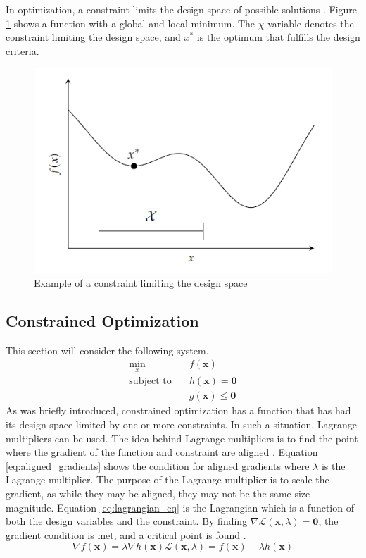 In optimization, a constraint limits the design space of possible solutions \cite{Kochenderfer_Wheeler_2019}. Figure \ref{fig:constraint_example} shows a function with a global and local minimum. The $\chi$ variable denotes the constraint limiting the design space, and $x^*$ is the optimum that fulfills the design criteria.
\begin{figure}[ht]
	\centering
	\includegraphics[width=0.6\linewidth]{figures/chapter_2/ContraintExample.png}
	\caption{Example of a constraint limiting the design space \cite{Kochenderfer_Wheeler_2019}}
	\label{fig:constraint_example}
\end{figure}

\subsection*{Constrained Optimization}
This section will consider the following system.
\begin{equation}
	\begin{split}
		\min_x \quad &f(\mathbf x) \\
		\text{subject to} \quad & h(\mathbf x) = \mathbf 0\\
		& g(\mathbf x) \leq \mathbf 0
	\end{split}
\end{equation}
As was briefly introduced, constrained optimization has a function that has had its design space limited by one or more constraints. In such a situation, Lagrange multipliers can be used. The idea behind Lagrange multipliers is to find the point where the gradient of the function and constraint are aligned \cite{Kochenderfer_Wheeler_2019}. Equation \ref{eq:aligned_gradients} shows the condition for aligned gradients where $\lambda$ is the Lagrange multiplier. The purpose of the Lagrange multiplier is to scale the gradient, as while they may be aligned, they may not be the same size magnitude. Equation \ref{eq:lagrangian_eq} is the Lagrangian which is a function of both the design variables and the constraint. By finding $\nabla\mathcal{L}(\mathbf{x},\lambda) = \mathbf{0}$, the gradient condition is met, and a critical point is found \cite{Kochenderfer_Wheeler_2019}. 
\begin{subequations}
	\begin{equation}
		\nabla f(\mathbf{x})=\lambda\nabla h(\mathbf{x})
		\label{eq:aligned_gradients}
	\end{equation}
	\begin{equation}
		\mathcal{L}(\mathbf{x},\lambda) = f(\mathbf{x}) - \lambda h(\mathbf{x})
		\label{eq:lagrangian_eq}
	\end{equation}
\end{subequations}


